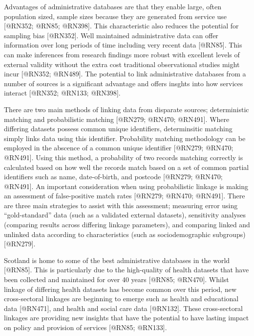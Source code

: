\documentclass[]{article}
\begin{document}
Advantages of administrative databases are that they enable large, often
population sized, sample sizes because they are generated from service
use {[}@RN352; @RN85; @RN398{]}. This characteristic also reduces the
potential for sampling bias {[}@RN352{]}. Well maintained administrative
data can offer information over long periods of time including very
recent data {[}@RN85{]}. This can make inferences from research findings
more robust with excellent levels of external validity without the extra
cost traditional observational studies might incur {[}@RN352; @RN489{]}.
The potential to link administrative databases from a number of sources
is a significant advantage and offers insghts into how services interact
{[}@RN352; @RN133; @RN398{]}.

There are two main methods of linking data from disparate sources;
deterministic matching and probabilistic matching {[}@RN279; @RN470;
@RN491{]}. Where differing datasets possess common unique identifiers,
determinsitic matching simply links data using this identifier.
Probability matching methodology can be employed in the abscence of a
common unique identifier {[}@RN279; @RN470; @RN491{]}. Using this
method, a probability of two records matching correctly is calculated
based on how well the records match based on a set of common partial
identifiers such as name, date-of-birth, and postcode {[}@RN279; @RN470;
@RN491{]}. An important consideration when using probabilistic linkage
is making an assessment of false-positive match rates {[}@RN279; @RN470;
@RN491{]}. There are three main strategies to assist with this
assessment; measuring error using ``gold-standard'' data (such as a
validated external datasets), sensitivity analyses (comparing results
across differing linkage parameters), and comparing linked and unlinked
data according to characteristics (such as sociodemographic subgroups)
{[}@RN279{]}.

Scotland is home to some of the best administrative databases in the
world {[}@RN85{]}. This is particularly due to the high-quality of
health datasets that have been collected and maintained for over 40
years {[}@RN85; @RN470{]}. Whilst linkage of differing health datasets
has become common over this period, new cross-sectoral linkages are
beginning to emerge such as health and educational data {[}@RN471{]},
and health and social care data {[}@RN132{]}. These cross-sectoral
linkages are providing new insights that have the potential to have
lasting impact on policy and provision of services {[}@RN85; @RN133{]}.
\end{document}
